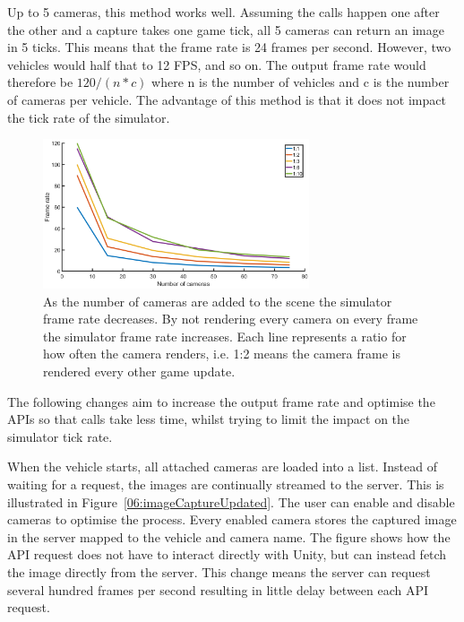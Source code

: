 Up to 5 cameras, this method works well. Assuming the calls happen one after the other and a capture takes one game tick, all 5 cameras can return an image in 5 ticks. This means that the frame rate is 24 frames per second. However, two vehicles would half that to 12 FPS, and so on. The output frame rate would therefore be $120/(n*c)$ where n is the number of vehicles and c is the number of cameras per vehicle. The advantage of this method is that it does not impact the tick rate of the simulator. 

\begin{figure}
    \includegraphics[width=0.7\textwidth]{06_Implementation/00_AirSim/Diagrams/frameRates.png}
    \caption[AirSim tick rates]{As the number of cameras are added to the scene the simulator frame rate decreases. By not rendering every camera on every frame the simulator frame rate increases. Each line represents a ratio for how often the camera renders, i.e. 1:2 means the camera frame is rendered every other game update.} \label{06:frameRates}
\end{figure}
The following changes aim to increase the output frame rate and optimise the APIs so that calls take less time, whilst trying to limit the impact on the simulator tick rate. 

When the vehicle starts, all attached cameras are loaded into a list. Instead of waiting for a request, the images are continually streamed to the server. This is illustrated in Figure~\ref{06:imageCaptureUpdated}. The user can enable and disable cameras to optimise the process. Every enabled camera stores the captured image in the server mapped to the vehicle and camera name. The figure shows how the API request does not have to interact directly with Unity, but can instead fetch the image directly from the server. This change means the server can request several hundred frames per second resulting in little delay between each API request. 

